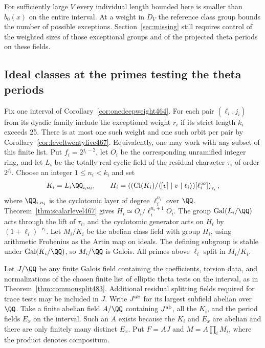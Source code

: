 \documentclass[a4paper,11pt]{article}
\theoremstyle{definition}
\theoremstyle{remark}
\numberwithin{equation}{section}
\newcommand{\Cl}{\operatorname{Cl}}
\begin{document}
For sufficiently large \(V\) every individual length bounded
here is smaller than \(b_0(x)\) on the entire interval.
At a weight in \(D_V\) the reference class group bounds the
number of possible exceptions. Section~\ref{sec:missing} still
requires control of the weighted sizes of those exceptional
groups and of the projected theta periods on these fields.


\subsection{Ideal classes at the primes testing the theta periods}
\label{sec:jointclasses503}

Fix one interval of Corollary~\ref{cor:onedeepweight464}. For
each pair \((\ell_i,j_i)\) from its dyadic family include the
exceptional weight \(r_i\) if its strict length \(k_i\) exceeds
25. There is at most one such weight and one such orbit per
pair by Corollary~\ref{cor:leveltwentyfive467}. Equivalently,
one may work with any subset of this finite list. Put
\(f_i=2^{j_i-2}\), let \(O_i\) be the corresponding unramified
integer ring, and let \(L_i\) be the totally real cyclic field
of the residual character \(\tau_i\) of order \(2^{j_i}\).
Choose an integer \(1\le n_i<k_i\) and set
\[
 K_i=L_i\QQ_{i,n_i},\qquad
 H_i=\left((\Cl(K_i)/\langle[v]\mid v\mid\ell_i\rangle)
                   [\ell_i^\infty]\right)_{\tau_i},
\]
where \(\QQ_{i,n_i}\) is the cyclotomic layer of degree
\(\ell_i^{n_i}\) over \(\QQ\). Theorem~\ref{thm:scalarlevel467}
gives \(H_i\simeq O_i/\ell_i^{n_i+1}O_i\). The group
\(\operatorname{Gal}(L_i/\QQ)\) acts through the lift of
\(\tau_i\), and the cyclotomic generator
acts on \(H_i\) by \((1+\ell_i)^{-r_i}\). Let \(M_i/K_i\)
be the abelian class field with group \(H_i\), using arithmetic
Frobenius as the Artin map on ideals. The defining subgroup is
stable under \(\operatorname{Gal}(K_i/\QQ)\), so \(M_i/\QQ\)
is Galois. All primes above \(\ell_i\) split in \(M_i/K_i\).

Let \(J/\QQ\) be any finite Galois field containing the
coefficients, torsion data, and normalizations of the chosen
finite list of elliptic theta tests on the interval, as in
Theorem~\ref{thm:commonsplit483}. Additional residual
splitting fields required for trace tests may be included in \(J\).
Write \(J^{\rm ab}\) for its largest subfield abelian over \(\QQ\).
Take a finite abelian field \(A/\QQ\) containing \(J^{\rm ab}\),
all the \(K_i\), and the period fields \(E_x\) on the interval.
Such an \(A\) exists because the \(K_i\) and \(E_x\) are abelian
and there are only finitely many distinct \(E_x\).
Put \(F=AJ\) and \(M=A\prod_i M_i\), where the product denotes
compositum.
\end{document}
